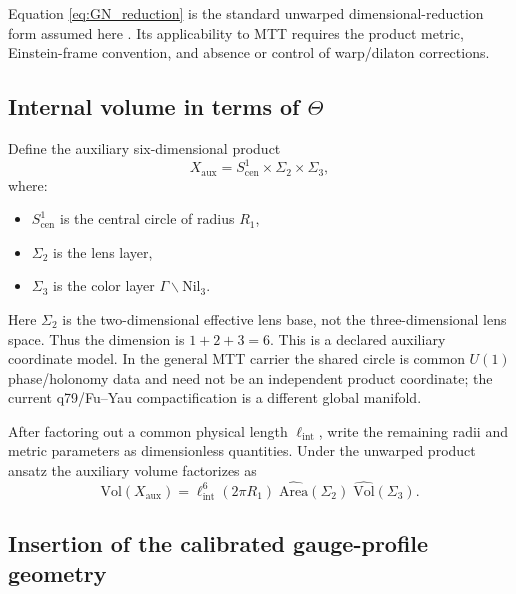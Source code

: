 \documentclass[11pt]{article}
\begin{document}
Equation \eqref{eq:GN_reduction} is the standard unwarped
dimensional-reduction form assumed here \cite{DuffNilssonPope}. Its
applicability to MTT requires the product metric,
Einstein-frame convention, and absence or control of warp/dilaton corrections.

\subsection{Internal volume in terms of
\texorpdfstring{$\Theta$}{Theta}}

Define the auxiliary six-dimensional product
\begin{equation}
X_{\mathrm{aux}}
=
S^1_{\mathrm{cen}} \times \Sigma_2 \times \Sigma_3,
\end{equation}
where:
\begin{itemize}
\item $S^1_{\mathrm{cen}}$ is the central circle of radius $R_1$,
\item $\Sigma_2$ is the lens layer,
\item $\Sigma_3$ is the color layer $\Gamma\backslash\mathrm{Nil}_3$.
\end{itemize}

Here $\Sigma_2$ is the two-dimensional effective lens base, not the
three-dimensional lens space. Thus the dimension is $1+2+3=6$. This is a
declared auxiliary coordinate model. In the general MTT carrier the shared
circle is common $U(1)$ phase/holonomy data and need not be an independent
product coordinate; the current q79/Fu--Yau compactification is a different
global manifold.

After factoring out a common physical length $\ell_{\mathrm{int}}$,
write the remaining radii and metric parameters as dimensionless quantities.
Under the unwarped product ansatz the auxiliary volume factorizes as
\begin{equation}
\mathrm{Vol}(X_{\mathrm{aux}})
=
\ell_{\mathrm{int}}^6(2\pi R_1)\;
\widehat{\mathrm{Area}}(\Sigma_2)\;
\widehat{\mathrm{Vol}}(\Sigma_3).
\label{eq:internal_volume_factorized}
\end{equation}

\subsection{Insertion of the calibrated gauge-profile geometry}
\end{document}
